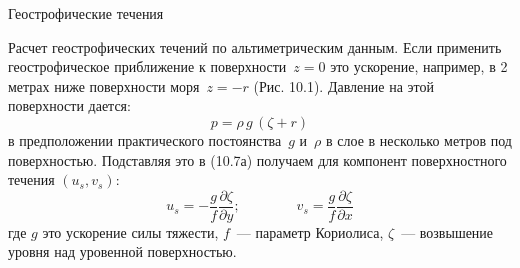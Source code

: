 \begin{chapter}{Геострофические течения}
\begin{section}{Расчет геострофических течений по альтиметрическим данным.}
Если применить геострофическое приближение к поверхности~$z = 0$ это
ускорение, например, в 2 метрах ниже поверхности моря~$z = -r$
(Рис. 10.1). Давление на этой поверхности дается:
\begin{equation}
 p = \rho\,g\,\left(\zeta + r\right)
\end{equation}
в предположении практического постоянства~$g$ и~$\rho$ в слое в несколько
метров под поверхностью. Подставляя это в (10.7а) получаем для
компонент поверхностного течения $(u_s, v_s)$:
\begin{equation}
 u_s =-\frac{g}{f}\frac{\partial\zeta}{\partial y}; \qquad \qquad
 v_s = \frac{g}{f}\frac{\partial\zeta}{\partial x}
\end{equation}
где $g$ это ускорение силы тяжести, $f$~--- параметр Кориолиса, 
$\zeta$~--- возвышение уровня над уровенной поверхностью.
%
%
%


\end{section}
\end{chapter}
